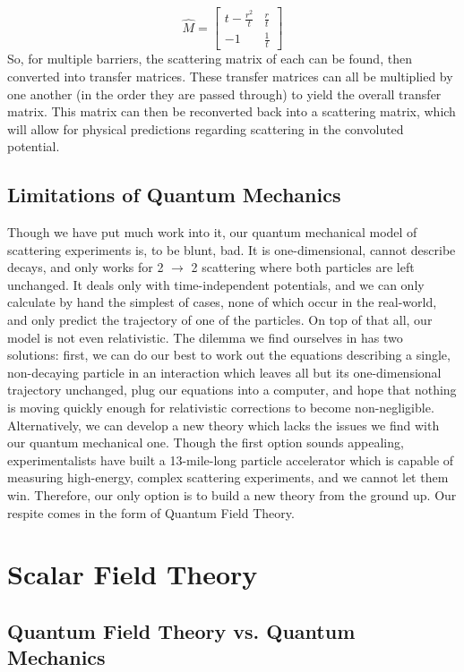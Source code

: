 \documentclass{report}
\begin{document}
\[
\hat{M} = \begin{bmatrix} t - \frac{r^2}{t} & \frac{r}{t} \\ -1 & \frac{1}{t} \end{bmatrix}
\]
So, for multiple barriers, the scattering matrix of each can be found, then converted into transfer matrices. These transfer matrices can all be multiplied by one another (in the order they are passed through) to yield the overall transfer matrix. This matrix can then be reconverted back into a scattering matrix, which will allow for physical predictions regarding scattering in the convoluted potential.

\chapter{Limitations of Quantum Mechanics}
Though we have put much work into it, our quantum mechanical model of scattering experiments is, to be blunt, bad. It is one-dimensional, cannot describe decays, and only works for 2 $\rightarrow$ 2 scattering where both particles are left unchanged. It deals only with time-independent potentials, and we can only calculate by hand the simplest of cases, none of which occur in the real-world, and only predict the trajectory of one of the particles. On top of that all, our model is not even relativistic. The dilemma we find ourselves in has two solutions: first, we can do our best to work out the equations describing a single, non-decaying particle in an interaction which leaves all but its one-dimensional trajectory unchanged, plug our equations into a computer, and hope that nothing is moving quickly enough for relativistic corrections to become non-negligible.  Alternatively, we can develop a new theory which lacks the issues we find with our quantum mechanical one. Though the first option sounds appealing, experimentalists have built a 13-mile-long particle accelerator which is capable of measuring high-energy, complex scattering experiments, and we cannot let them win. Therefore, our only option is to build a new theory from the ground up. Our respite comes in the form of Quantum Field Theory.

\newpage
\part{Scalar Field Theory}
\chapter{Quantum Field Theory vs. Quantum Mechanics}
\end{document}
